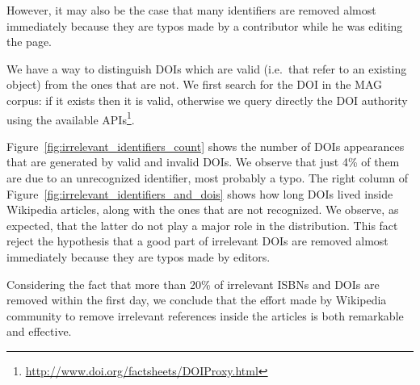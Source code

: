 However, it may also be the case that many identifiers are removed almost immediately because they are typos made by a contributor while he was editing the page.

We have a way to distinguish \acp{DOI} which are valid (i.e.\ that refer to an existing object) from the ones that are not.
We first search for the DOI in the MAG corpus: if it exists then it is valid, otherwise we query directly the DOI authority using the available APIs\footnote{\url{http://www.doi.org/factsheets/DOIProxy.html}}.


Figure~\ref{fig:irrelevant_identifiers_count} shows the number of \acp{DOI} appearances that are generated by valid and invalid DOIs.
We observe that just 4\% of them are due to an unrecognized identifier, most probably a typo.
The right column of Figure~\ref{fig:irrelevant_identifiers_and_dois} shows how long DOIs lived inside Wikipedia articles, along with the ones that are not recognized.
We observe, as expected, that the latter do not play a major role in the distribution.
This fact reject the hypothesis that a good part of irrelevant DOIs are removed almost immediately because they are typos made by editors.

Considering the fact that more than 20\% of irrelevant \acp{ISBN} and \acp{DOI} are removed within the first day, we conclude that the effort made by Wikipedia community to remove irrelevant references inside the articles is both remarkable and effective.


